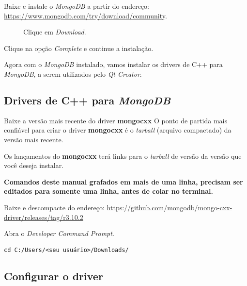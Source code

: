 \documentclass[a4paper,11pt]{article}
\newcommand{\qtcreator}{\textit{Qt Creator}}
\newcommand{\download}{\textit{Download}}
\newcommand{\mongo}{\textit{MongoDB}}
\newcommand{\cautionbox}[1]{
	\vskip 5mm
	\begin{leftbar}
		\textbf{#1}
	\end{leftbar}
	\vskip 5mm
}
\begin{document}
Baixe e instale o \mongo{} a partir do endereço: \url{https://www.mongodb.com/try/download/community}.

\begin{figure}[H]
	\centering
	\caption{Clique em \download{}.}\label{fig:mongodb_download_2}
\end{figure}

Clique na opção \textit{Complete} e continue a instalação.

Agora com o \mongo{} instalado, vamos instalar os drivers de C++ para \mongo{}, a serem utilizados pelo \qtcreator{}.


\subsection*{Drivers de C++ para \mongo{}}

Baixe a versão mais recente do driver \textbf{mongocxx}
O ponto de partida mais confiável para criar o driver \textbf{mongocxx} é o \textit{tarball} (arquivo compactado) da versão mais recente.

Os lançamentos do \textbf{mongocxx} terá links para o \textit{tarball} de versão da versão que você deseja instalar.

\cautionbox{\color{orange}Comandos deste manual grafados em mais de uma linha, precisam ser editados para somente uma linha, antes de colar no terminal.}

Baixe e descompacte do endereço: \url{https://github.com/mongodb/mongo-cxx-driver/releases/tag/r3.10.2}

Abra o \textit{Developer Command Prompt}.
\begin{mdframed}
\begin{verbatim}
cd C:/Users/<seu usuário>/Downloads/
\end{verbatim}
\end{mdframed}

\subsection*{Configurar o driver}
\end{document}
